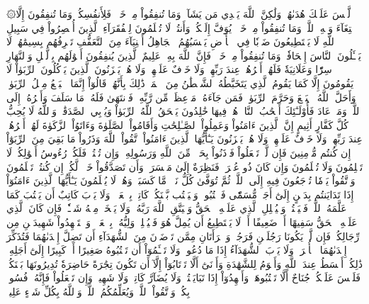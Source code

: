 ۞لَّيۡسَ عَلَيۡكَ هُدَىٰهُمۡ وَلَٰكِنَّ ٱللَّهَ يَهۡدِي مَن يَشَآءُۗ وَمَا تُنفِقُواْ مِنۡ خَيۡرٖ فَلِأَنفُسِكُمۡۚ وَمَا تُنفِقُونَ إِلَّا ٱبۡتِغَآءَ وَجۡهِ ٱللَّهِۚ وَمَا تُنفِقُواْ مِنۡ خَيۡرٖ يُوَفَّ إِلَيۡكُمۡ وَأَنتُمۡ لَا تُظۡلَمُونَ
لِلۡفُقَرَآءِ ٱلَّذِينَ أُحۡصِرُواْ فِي سَبِيلِ ٱللَّهِ لَا يَسۡتَطِيعُونَ ضَرۡبٗا فِي ٱلۡأَرۡضِ يَحۡسَبُهُمُ ٱلۡجَاهِلُ أَغۡنِيَآءَ مِنَ ٱلتَّعَفُّفِ تَعۡرِفُهُم بِسِيمَٰهُمۡ لَا يَسۡـَٔلُونَ ٱلنَّاسَ إِلۡحَافٗاۗ وَمَا تُنفِقُواْ مِنۡ خَيۡرٖ فَإِنَّ ٱللَّهَ بِهِۦ عَلِيمٌ
ٱلَّذِينَ يُنفِقُونَ أَمۡوَٰلَهُم بِٱلَّيۡلِ وَٱلنَّهَارِ سِرّٗا وَعَلَانِيَةٗ فَلَهُمۡ أَجۡرُهُمۡ عِندَ رَبِّهِمۡ وَلَا خَوۡفٌ عَلَيۡهِمۡ وَلَا هُمۡ يَحۡزَنُونَ
ٱلَّذِينَ يَأۡكُلُونَ ٱلرِّبَوٰاْ لَا يَقُومُونَ إِلَّا كَمَا يَقُومُ ٱلَّذِي يَتَخَبَّطُهُ ٱلشَّيۡطَٰنُ مِنَ ٱلۡمَسِّۚ ذَٰلِكَ بِأَنَّهُمۡ قَالُوٓاْ إِنَّمَا ٱلۡبَيۡعُ مِثۡلُ ٱلرِّبَوٰاْۗ وَأَحَلَّ ٱللَّهُ ٱلۡبَيۡعَ وَحَرَّمَ ٱلرِّبَوٰاْۚ فَمَن جَآءَهُۥ مَوۡعِظَةٞ مِّن رَّبِّهِۦ فَٱنتَهَىٰ فَلَهُۥ مَا سَلَفَ وَأَمۡرُهُۥٓ إِلَى ٱللَّهِۖ وَمَنۡ عَادَ فَأُوْلَـٰٓئِكَ أَصۡحَٰبُ ٱلنَّارِۖ هُمۡ فِيهَا خَٰلِدُونَ
يَمۡحَقُ ٱللَّهُ ٱلرِّبَوٰاْ وَيُرۡبِي ٱلصَّدَقَٰتِۗ وَٱللَّهُ لَا يُحِبُّ كُلَّ كَفَّارٍ أَثِيمٍ
إِنَّ ٱلَّذِينَ ءَامَنُواْ وَعَمِلُواْ ٱلصَّـٰلِحَٰتِ وَأَقَامُواْ ٱلصَّلَوٰةَ وَءَاتَوُاْ ٱلزَّكَوٰةَ لَهُمۡ أَجۡرُهُمۡ عِندَ رَبِّهِمۡ وَلَا خَوۡفٌ عَلَيۡهِمۡ وَلَا هُمۡ يَحۡزَنُونَ
يَـٰٓأَيُّهَا ٱلَّذِينَ ءَامَنُواْ ٱتَّقُواْ ٱللَّهَ وَذَرُواْ مَا بَقِيَ مِنَ ٱلرِّبَوٰٓاْ إِن كُنتُم مُّؤۡمِنِينَ
فَإِن لَّمۡ تَفۡعَلُواْ فَأۡذَنُواْ بِحَرۡبٖ مِّنَ ٱللَّهِ وَرَسُولِهِۦۖ وَإِن تُبۡتُمۡ فَلَكُمۡ رُءُوسُ أَمۡوَٰلِكُمۡ لَا تَظۡلِمُونَ وَلَا تُظۡلَمُونَ
وَإِن كَانَ ذُو عُسۡرَةٖ فَنَظِرَةٌ إِلَىٰ مَيۡسَرَةٖۚ وَأَن تَصَدَّقُواْ خَيۡرٞ لَّكُمۡ إِن كُنتُمۡ تَعۡلَمُونَ
وَٱتَّقُواْ يَوۡمٗا تُرۡجَعُونَ فِيهِ إِلَى ٱللَّهِۖ ثُمَّ تُوَفَّىٰ كُلُّ نَفۡسٖ مَّا كَسَبَتۡ وَهُمۡ لَا يُظۡلَمُونَ
يَـٰٓأَيُّهَا ٱلَّذِينَ ءَامَنُوٓاْ إِذَا تَدَايَنتُم بِدَيۡنٍ إِلَىٰٓ أَجَلٖ مُّسَمّٗى فَٱكۡتُبُوهُۚ وَلۡيَكۡتُب بَّيۡنَكُمۡ كَاتِبُۢ بِٱلۡعَدۡلِۚ وَلَا يَأۡبَ كَاتِبٌ أَن يَكۡتُبَ كَمَا عَلَّمَهُ ٱللَّهُۚ فَلۡيَكۡتُبۡ وَلۡيُمۡلِلِ ٱلَّذِي عَلَيۡهِ ٱلۡحَقُّ وَلۡيَتَّقِ ٱللَّهَ رَبَّهُۥ وَلَا يَبۡخَسۡ مِنۡهُ شَيۡـٔٗاۚ فَإِن كَانَ ٱلَّذِي عَلَيۡهِ ٱلۡحَقُّ سَفِيهًا أَوۡ ضَعِيفًا أَوۡ لَا يَسۡتَطِيعُ أَن يُمِلَّ هُوَ فَلۡيُمۡلِلۡ وَلِيُّهُۥ بِٱلۡعَدۡلِۚ وَٱسۡتَشۡهِدُواْ شَهِيدَيۡنِ مِن رِّجَالِكُمۡۖ فَإِن لَّمۡ يَكُونَا رَجُلَيۡنِ فَرَجُلٞ وَٱمۡرَأَتَانِ مِمَّن تَرۡضَوۡنَ مِنَ ٱلشُّهَدَآءِ أَن تَضِلَّ إِحۡدَىٰهُمَا فَتُذَكِّرَ إِحۡدَىٰهُمَا ٱلۡأُخۡرَىٰۚ وَلَا يَأۡبَ ٱلشُّهَدَآءُ إِذَا مَا دُعُواْۚ وَلَا تَسۡـَٔمُوٓاْ أَن تَكۡتُبُوهُ صَغِيرًا أَوۡ كَبِيرًا إِلَىٰٓ أَجَلِهِۦۚ ذَٰلِكُمۡ أَقۡسَطُ عِندَ ٱللَّهِ وَأَقۡوَمُ لِلشَّهَٰدَةِ وَأَدۡنَىٰٓ أَلَّا تَرۡتَابُوٓاْ إِلَّآ أَن تَكُونَ تِجَٰرَةً حَاضِرَةٗ تُدِيرُونَهَا بَيۡنَكُمۡ فَلَيۡسَ عَلَيۡكُمۡ جُنَاحٌ أَلَّا تَكۡتُبُوهَاۗ وَأَشۡهِدُوٓاْ إِذَا تَبَايَعۡتُمۡۚ وَلَا يُضَآرَّ كَاتِبٞ وَلَا شَهِيدٞۚ وَإِن تَفۡعَلُواْ فَإِنَّهُۥ فُسُوقُۢ بِكُمۡۗ وَٱتَّقُواْ ٱللَّهَۖ وَيُعَلِّمُكُمُ ٱللَّهُۗ وَٱللَّهُ بِكُلِّ شَيۡءٍ عَلِيمٞ
